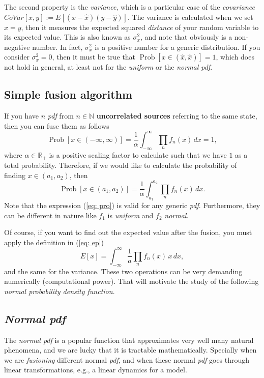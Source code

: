\documentclass[11pt,a4paper]{article}
\begin{document}
The second property is the \emph{variance}, which is a particular case of the \emph{covariance} $CoVar[x,y] := E[(x-\hat x)(y-\hat y)]$. The variance is calculated when we set $x=y$, then it measures the expected squared \emph{distance} of your random variable to its expected value. This is also known as $\sigma_x^2$, and note that obviously is a non-negative number. In fact, $\sigma_x^2$ is a positive number for a generic distribution. If you consider $\sigma_x^2 = 0$, then it must be true that  $\operatorname{Prob}[x\in (\hat x,\hat x)] = 1$, which does not hold in general, at least not for the \emph{uniform} or the \emph{normal pdf}.

\subsection{Simple fusion algorithm}
If you have $n$ \emph{pdf} from $n\in\mathbb{N}$ {\bf uncorrelated sources} referring to the same state, then you can fuse them as follows
\begin{equation}
	\operatorname{Prob}[x\in (-\infty,\infty)] = \frac{1}{\alpha}\int_{-\infty}^{\infty} \prod_n f_n(x) \, dx = 1, \label{eq: fus}
\end{equation}
where $\alpha\in\mathbb{R}_+$ is a positive scaling factor to calculate such that we have $1$ as a total probability. Therefore, if we would like to calculate the probability of finding $x\in(a_1,a_2)$, then
\begin{equation}
	\operatorname{Prob}[x\in (a_1,a_2)] = \frac{1}{\alpha}\int_{a_1}^{a_2} \prod_n f_n(x) \, dx. \label{eq: pro}
\end{equation}
Note that the expression (\ref{eq: pro}) is valid for any generic \emph{pdf}. Furthermore, they can be different in nature like $f_1$ is \emph{uniform} and $f_2$ \emph{normal}.

Of course, if you want to find out the expected value after the fusion, you must apply the definition in (\ref{eq: ep})
\begin{equation}
	E[x] = \int_{-\infty}^{\infty} \frac{1}{a}\prod_n f_n(x)\, x \,dx,
\end{equation}
and the same for the variance. These two operations can be very demanding numerically (computational power). That will motivate the study of the following \emph{normal probability density function}.

\subsection{\emph{Normal pdf}}
The \emph{normal pdf} is a popular function that approximates very well many natural phenomena, and we are lucky that it is tractable mathematically. Specially when we are \emph{fusioning} different normal \emph{pdf}, and when these normal \emph{pdf} goes through linear transformations, e.g., a linear dynamics for a model.
\end{document}
